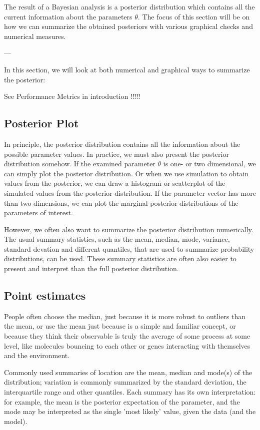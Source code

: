 The result of a Bayesian analysis is a posterior distribution which contains all the current information about the parameters $\theta$. The focus of this section will be on how we can summarize the obtained posteriors with various graphical checks and numerical measures.

---

In this section, we will look at both numerical and graphical ways to summarize the posterior:

See Performance Metrics in introduction !!!!!


\subsection{Posterior Plot}

In principle, the posterior distribution contains all the information about the possible parameter values. In practice, we must also present the posterior distribution somehow. If the examined parameter $\theta$
  is one- or two dimensional, we can simply plot the posterior distribution. Or when we use simulation to obtain values from the posterior, we can draw a histogram or scatterplot of the simulated values from the posterior distribution. If the parameter vector has more than two dimensions, we can plot the marginal posterior distributions of the parameters of interest.
  
 However, we often also want to summarize the posterior distribution numerically. The usual summary statistics, such as the mean, median, mode, variance, standard devation and different quantiles, that are used to summarize probability distributions, can be used. These summary statistics are often also easier to present and interpret than the full posterior distribution.

\subsection{Point estimates}

People often choose the median, just because it is more robust to outliers than the mean, or use the mean just because is a simple and familiar concept, or because they think their observable is truly the average of some process at some level, like molecules bouncing to each other or genes interacting with themselves and the environment.

Commonly used summaries of location are the mean, median and mode(s) of the distribution; variation is commonly summarized by the standard deviation, the interquartile range and other quantiles. Each summary has its own interpretation: for example, the mean is the posterior expectation of the parameter, and the mode may be interpreted as the single 'most likely' value, given the data (and the model).

